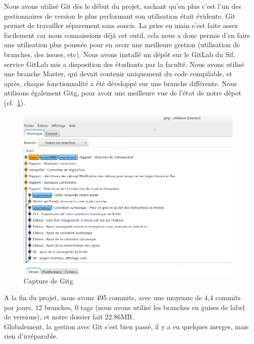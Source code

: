 Nous avons utilisé Git dès le début du projet, sachant qu'en plus c'est l'un des gestionnaires de version le plus performant son utilisation était évidente.
Git permet de travailler séparement sans soucis. La prise en main s'est faite assez facilement car nous connaissions déjà cet outil, cela nous a donc permis d'en faire une utilisation plus poussée pour en avoir une meilleure gestion (utilisation de branches, des issues, etc).
Nous avons installé un dépôt sur le GitLab du Sif, service GitLab mis a disposition des étudiants par la faculté.
 Nous avons utilisé une branche Master, qui devait contenir uniquement du code compilable, et après, chaque fonctionnalité a été développé sur une branche différente.
Nous utilisons également Gitg, pour avoir une meilleure vue de l'état de notre dêpot (cf.~\ref{Gitg}).
\begin{figure}[h]
\centering
\caption{\label{Gitg} Capture de Gitg}
\includegraphics[scale=0.35]{doc/gestionProjet/gitbranche.png}
\end{figure}
A la fin du projet, nous avons 495 commits, avec une moyenne de 4,4 commits par jours, 12 branches, 0 tags (nous avons utilisé les branches en guises de label de versions), et notre dossier fait 22.86MB.\\
Globalement, la gestion avec Git s'est bien passé, il y a eu quelques merges, mais rien d'irréparable. 
